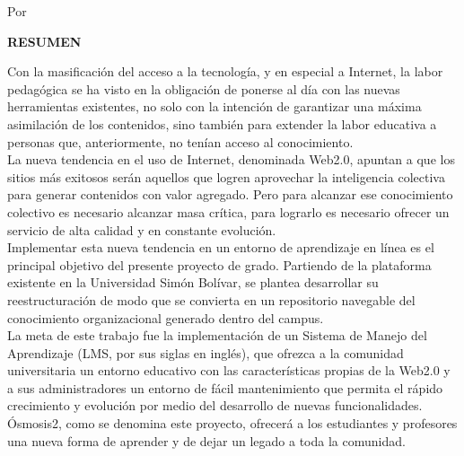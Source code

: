 \begin{large}
	\begin{center}
		\textbf{\titulo}
	\end{center}
\end{large}
\begin{large}
	\begin{center}
		Por \\
		\autores
	\end{center}
\end{large}

\begin{center}
	\textbf{RESUMEN}
\end{center}

Con la masificación del acceso a la tecnología, y en especial a Internet, la labor pedagógica se ha visto en la obligación de ponerse al día con las nuevas herramientas existentes, no solo con la intención de garantizar una máxima asimilación de los contenidos, sino también para extender la labor educativa a personas que, anteriormente, no tenían acceso al conocimiento.\\

La nueva tendencia en el uso de Internet, denominada Web2.0, apuntan a que los sitios más exitosos serán aquellos que logren aprovechar la inteligencia colectiva para generar contenidos con valor agregado. Pero para alcanzar ese conocimiento colectivo es necesario alcanzar masa crítica, para lograrlo es necesario ofrecer un servicio de alta calidad y en constante evolución.\\

Implementar esta nueva tendencia en un entorno de aprendizaje en línea es el principal objetivo del presente proyecto de grado. Partiendo de la plataforma existente en la Universidad Simón Bolívar, se plantea desarrollar su reestructuración de modo que se convierta en un repositorio navegable del conocimiento organizacional generado dentro del campus.\\

La meta de este trabajo fue la implementación de un Sistema de Manejo del Aprendizaje (LMS, por sus siglas en inglés), que ofrezca a la comunidad universitaria un entorno educativo con las características propias de la Web2.0 y a sus administradores un entorno de fácil mantenimiento que permita el rápido crecimiento y evolución por medio del desarrollo de nuevas funcionalidades.\\

Ósmosis2, como se denomina este proyecto, ofrecerá a los estudiantes y profesores una nueva forma de aprender y de dejar un legado a toda la comunidad.
